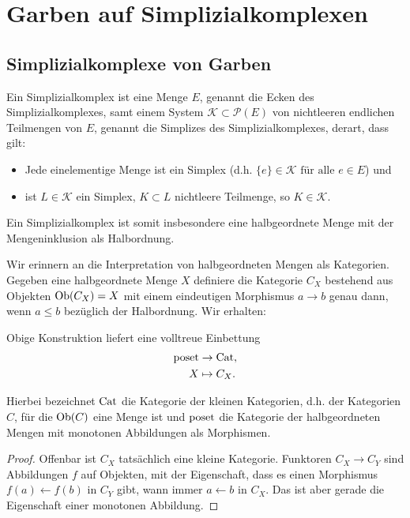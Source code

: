 
\chapter{Garben auf Simplizialkomplexen}
\label{ch:simp-comp}

\section{Simplizialkomplexe von Garben}
\label{sec:simp-comp-ord}

\begin{defn}
  Ein Simplizialkomplex ist eine Menge $E$, genannt die Ecken des
  Simplizialkomplexes, samt einem System $ \mathcal{K} \subset
  \mathcal{P}(E) $ von nichtleeren endlichen Teilmengen von $E$,
  genannt die Simplizes des Simplizialkomplexes, derart, dass gilt:
  \begin{itemize}
  \item Jede einelementige Menge ist ein Simplex (d.h. $\{e\} \in
    \mathcal{K} \text{ für alle } e \in E$) und
  \item ist $L \in \mathcal{K}$ ein Simplex, $K \subset L$ nichtleere
    Teilmenge, so $K \in \mathcal{K}$.
  \end{itemize}
\end{defn}

Ein Simplizialkomplex ist somit insbesondere eine halbgeordnete Menge
mit der Mengeninklusion als Halbordnung.

Wir erinnern an die Interpretation von halbgeordneten Mengen als
Kategorien. Gegeben eine halbgeordnete Menge $X$ definiere die
Kategorie $C_X$ bestehend aus Objekten $\operatorname{Ob}(C_X) = X$ mit einem
eindeutigen Morphismus $a \to b$ genau dann, wenn $a \leq b$ bezüglich
der Halbordnung. Wir erhalten:

\begin{lemma} \label{poset-cat}
  Obige Konstruktion liefert eine volltreue Einbettung
  \begin{align*}
    \operatorname{poset} &\to \operatorname{Cat}, \\
    X &\mapsto C_X.    
  \end{align*}
\end{lemma}

Hierbei bezeichnet $\operatorname{Cat}$ die Kategorie der kleinen Kategorien,
d.h. der Kategorien $C$, für die $\operatorname{Ob}(C)$ eine Menge ist und $\operatorname{poset}$
die Kategorie der halbgeordneten Mengen mit monotonen Abbildungen als
Morphismen.

\begin{proof}
  Offenbar ist $C_X$ tatsächlich eine kleine Kategorie. Funktoren $C_X
  \to C_Y$ sind Abbildungen $f$ auf Objekten, mit der Eigenschaft,
  dass es einen Morphismus $f(a) \leftarrow f(b)$ in $C_Y$ gibt, wann
  immer $a \leftarrow b$ in $C_X$. Das ist aber gerade die Eigenschaft
  einer monotonen Abbildung.
\end{proof}

